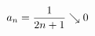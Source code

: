 \documentclass[preview]{standalone}
\begin{document}
\begin{align*}
\special{dvisvgm:raw <g id='unique000'>}a_n=\dfrac{1}{2n+1}\searrow 0\special{dvisvgm:raw </g>}
\end{align*}
\end{document}
